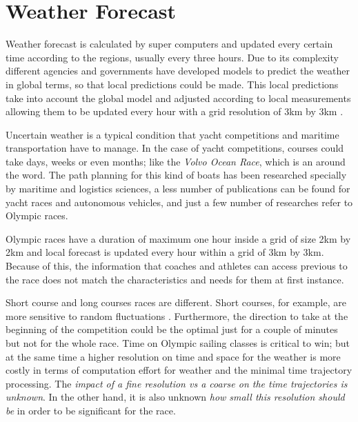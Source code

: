 \section{Weather Forecast}
Weather forecast is calculated by super computers and updated every certain time according to the regions, usually every three hours. Due to its complexity different agencies and governments have developed models to predict the weather in global terms, so that local predictions could be made. This local predictions take into account the global model and adjusted according to local measurements allowing them to be updated every hour with a grid resolution of 3km by 3km \cite{warner2010numerical}. \par

Uncertain weather is a typical condition that yacht competitions and maritime transportation have to manage. In the case of yacht competitions, courses could take days, weeks or even months; like the \textit{Volvo Ocean Race}, which is an around the word. The path planning for this kind of boats has been researched specially by maritime and logistics sciences, a less number of publications can be found for yacht races and autonomous vehicles, and just a few number of researches refer to Olympic races. \par  

 Olympic races have a duration of maximum one hour inside a grid of size 2km by 2km and local forecast is updated every hour within a grid of 3km by 3km. Because of this, the information that coaches and athletes can access previous to the race does not match the characteristics and needs for them at first instance.\par
 Short course and long courses races are different. Short courses, for example, are more sensitive to random fluctuations \cite{philpott2001optimising}. Furthermore, the direction to take at the beginning of the competition could be the optimal just for a couple of minutes but not for the whole race. Time on Olympic sailing classes is critical to win; but at the same time a higher resolution on time and space for the weather is more costly in terms of computation effort for weather and the minimal time trajectory processing. The \textit{impact of a fine resolution vs a coarse on the time trajectories is unknown}. In the other hand, it is also unknown \textit{how small this resolution should be} in order to be significant for the  race.\par
 
